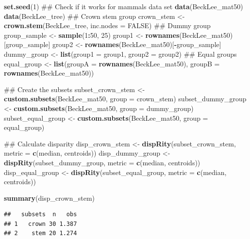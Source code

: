 \documentclass[]{book}
\newenvironment{Shaded}{\begin{snugshade}}{\end{snugshade}}
\newcommand{\KeywordTok}[1]{\textcolor[rgb]{0.13,0.29,0.53}{\textbf{#1}}}
\newcommand{\DataTypeTok}[1]{\textcolor[rgb]{0.13,0.29,0.53}{#1}}
\newcommand{\DecValTok}[1]{\textcolor[rgb]{0.00,0.00,0.81}{#1}}
\newcommand{\StringTok}[1]{\textcolor[rgb]{0.31,0.60,0.02}{#1}}
\newcommand{\OtherTok}[1]{\textcolor[rgb]{0.56,0.35,0.01}{#1}}
\newcommand{\OperatorTok}[1]{\textcolor[rgb]{0.81,0.36,0.00}{\textbf{#1}}}
\newcommand{\NormalTok}[1]{#1}
\theoremstyle{definition}
\theoremstyle{definition}
\theoremstyle{remark}
\begin{document}
\begin{Shaded}
\begin{Highlighting}[]
\KeywordTok{set.seed}\NormalTok{(}\DecValTok{1}\NormalTok{)}
\NormalTok{## Check if it works for mammals data set}
\KeywordTok{data}\NormalTok{(BeckLee_mat50)}
\KeywordTok{data}\NormalTok{(BeckLee_tree)}
\NormalTok{## Crown stem group}
\NormalTok{crown_stem <-}\StringTok{ }\KeywordTok{crown.stem}\NormalTok{(BeckLee_tree, }\DataTypeTok{inc.nodes =} \OtherTok{FALSE}\NormalTok{)}
\NormalTok{## Dummy group}
\NormalTok{group_sample <-}\StringTok{ }\KeywordTok{sample}\NormalTok{(}\DecValTok{1}\OperatorTok{:}\DecValTok{50}\NormalTok{, }\DecValTok{25}\NormalTok{)}
\NormalTok{group1 <-}\StringTok{ }\KeywordTok{rownames}\NormalTok{(BeckLee_mat50)[group_sample]}
\NormalTok{group2 <-}\StringTok{ }\KeywordTok{rownames}\NormalTok{(BeckLee_mat50)[}\OperatorTok{-}\NormalTok{group_sample]}
\NormalTok{dummy_group <-}\StringTok{ }\KeywordTok{list}\NormalTok{(}\DataTypeTok{group1 =}\NormalTok{ group1, }\DataTypeTok{group2 =}\NormalTok{ group2)}
\NormalTok{## Equal groups}
\NormalTok{equal_group <-}\StringTok{ }\KeywordTok{list}\NormalTok{(}\DataTypeTok{groupA =} \KeywordTok{rownames}\NormalTok{(BeckLee_mat50), }\DataTypeTok{groupB =} \KeywordTok{rownames}\NormalTok{(BeckLee_mat50))}

\NormalTok{## Create the subsets}
\NormalTok{subset_crown_stem <-}\StringTok{ }\KeywordTok{custom.subsets}\NormalTok{(BeckLee_mat50, }\DataTypeTok{group =}\NormalTok{ crown_stem)}
\NormalTok{subset_dummy_group <-}\StringTok{ }\KeywordTok{custom.subsets}\NormalTok{(BeckLee_mat50, }\DataTypeTok{group =}\NormalTok{ dummy_group)}
\NormalTok{subset_equal_group <-}\StringTok{ }\KeywordTok{custom.subsets}\NormalTok{(BeckLee_mat50, }\DataTypeTok{group =}\NormalTok{ equal_group)}

\NormalTok{## Calculate disparity}
\NormalTok{disp_crown_stem <-}\StringTok{ }\KeywordTok{dispRity}\NormalTok{(subset_crown_stem, }\DataTypeTok{metric =} \KeywordTok{c}\NormalTok{(median, centroids))}
\NormalTok{disp_dummy_group <-}\StringTok{ }\KeywordTok{dispRity}\NormalTok{(subset_dummy_group, }\DataTypeTok{metric =} \KeywordTok{c}\NormalTok{(median, centroids))}
\NormalTok{disp_equal_group <-}\StringTok{ }\KeywordTok{dispRity}\NormalTok{(subset_equal_group, }\DataTypeTok{metric =} \KeywordTok{c}\NormalTok{(median, centroids))}

\KeywordTok{summary}\NormalTok{(disp_crown_stem)}
\end{Highlighting}
\end{Shaded}

\begin{verbatim}
##   subsets  n   obs
## 1   crown 30 1.387
## 2    stem 20 1.274
\end{verbatim}
\end{document}
